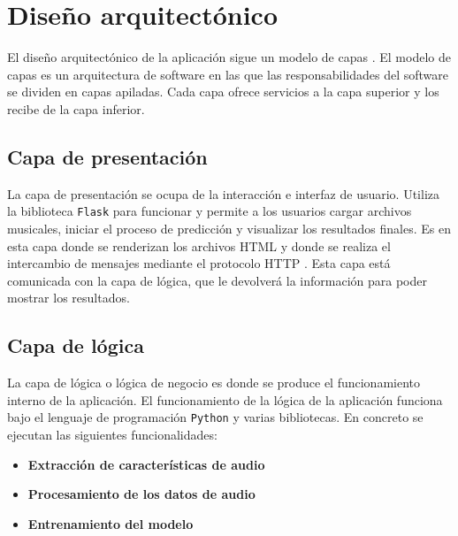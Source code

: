 
\section{Diseño arquitectónico}

El diseño arquitectónico de la aplicación sigue un modelo de capas \cite{Blancarte}.
El modelo de capas es un arquitectura de software en las que las responsabilidades del software se dividen en capas apiladas. Cada capa ofrece servicios a la capa superior y los recibe de la capa inferior.

\subsection{Capa de presentación}

La capa de presentación se ocupa de la interacción e interfaz de usuario. Utiliza la biblioteca \texttt{Flask} para funcionar y permite a los usuarios cargar archivos musicales, iniciar el proceso de predicción y visualizar los resultados finales.
Es en esta capa donde se renderizan los archivos HTML \cite{HTML_tutorial} y donde se realiza el intercambio de mensajes mediante el protocolo HTTP \cite{MozDevNet}. Esta capa está comunicada con la capa de lógica, que le devolverá la información para poder mostrar los resultados.

\subsection{Capa de lógica}

La capa de lógica o lógica de negocio es donde se produce el funcionamiento interno de la aplicación. El funcionamiento de la lógica de la aplicación funciona bajo el lenguaje de programación \texttt{Python} y varias bibliotecas. En concreto se ejecutan las siguientes funcionalidades:

\begin{itemize}
\tightlist

\item \textbf{Extracción de características de audio}

\item \textbf{Procesamiento de los datos de audio}

\item \textbf{Entrenamiento del modelo}

\end{itemize}

